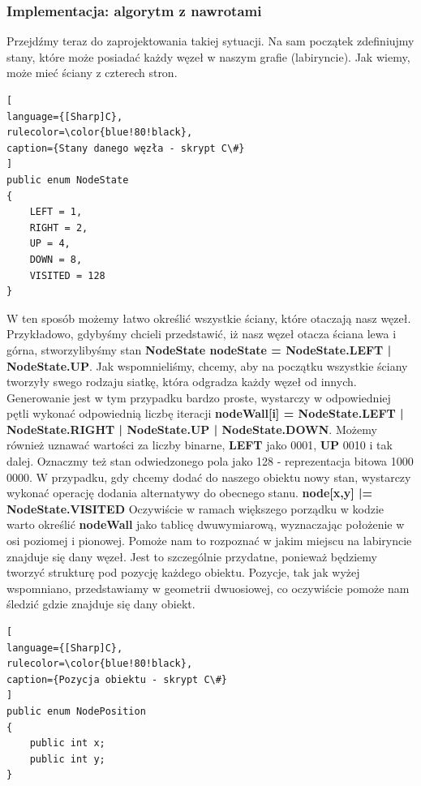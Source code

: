 \documentclass[oneside,polski,logo]{amuthesis}
\begin{document}
\subsubsection{Implementacja: algorytm z nawrotami}
\par Przejdźmy teraz do zaprojektowania takiej sytuacji. Na sam początek zdefiniujmy stany, które może posiadać każdy węzeł w naszym grafie (labiryncie). Jak wiemy, może mieć ściany z czterech stron. 
\begin{lstlisting}[
language={[Sharp]C},
rulecolor=\color{blue!80!black},
caption={Stany danego węzła - skrypt C\#}
]
public enum NodeState
{
    LEFT = 1,
    RIGHT = 2,
    UP = 4,
    DOWN = 8,
    VISITED = 128
}
\end{lstlisting}
W ten sposób możemy łatwo określić wszystkie ściany, które otaczają nasz węzeł. Przykładowo, gdybyśmy chcieli przedstawić, iż nasz węzeł otacza ściana lewa i górna, stworzylibyśmy stan \textbf{NodeState nodeState = NodeState.LEFT | NodeState.UP}. Jak wspomnieliśmy, chcemy, aby na początku wszystkie ściany tworzyły swego rodzaju siatkę, która odgradza każdy węzeł od innych. Generowanie jest w tym przypadku bardzo proste, wystarczy w odpowiedniej pętli wykonać odpowiednią liczbę iteracji \textbf{nodeWall[i] = NodeState.LEFT | NodeState.RIGHT | NodeState.UP | NodeState.DOWN}. Możemy również uznawać wartości za liczby binarne, \textbf{LEFT} jako 0001, \textbf{UP} 0010 i tak dalej. Oznaczmy też stan odwiedzonego pola jako 128 - reprezentacja bitowa 1000 0000. W przypadku, gdy chcemy dodać do naszego obiektu nowy stan, wystarczy wykonać operację dodania alternatywy do obecnego stanu. \textbf{node[x,y] |= NodeState.VISITED} Oczywiście w ramach większego porządku w kodzie warto określić \textbf{nodeWall} jako tablicę dwuwymiarową, wyznaczając położenie w osi poziomej i pionowej. Pomoże nam to rozpoznać w jakim miejscu na labiryncie znajduje się dany węzeł. Jest to szczególnie przydatne, ponieważ będziemy tworzyć strukturę pod pozycję każdego obiektu. Pozycje, tak jak wyżej wspomniano, przedstawiamy w geometrii dwuosiowej, co oczywiście pomoże nam śledzić gdzie znajduje się dany obiekt. 
\begin{lstlisting}[
language={[Sharp]C},
rulecolor=\color{blue!80!black},
caption={Pozycja obiektu - skrypt C\#}
]
public enum NodePosition
{
	public int x;
	public int y;
}
\end{lstlisting}
\end{document}
